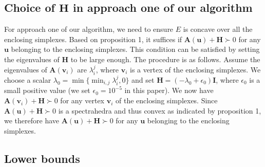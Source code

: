 \documentclass[11pt,bezier,]{article}
\begin{document}


\subsection{Choice of  $\mathbf H$ in approach one of our algorithm\label{subsec:H}}
For approach one of our algorithm, we need to ensure $E$ is concave over all the enclosing simplexes.
Based on proposition 1,
it suffices if $\mathbf A(\mathbf u)+\mathbf H\succ0$ for any $\mathbf u$ belonging to  the enclosing simplexes.
This condition can be satisfied by setting
the eigenvalues  of $\mathbf H$ to be large enough.
The procedure is as follows.
Assume  the eigenvalues of  $\mathbf A(\mathbf v_i)$ are $\lambda^j_i$,
where $\mathbf v_i$ is a vertex of  the enclosing simplexes.
We choose a scalar   
$\lambda_0 =\min \{\min_{i,j} {\lambda_i^j},0 \}$
and   set $\mathbf H=(-\lambda_0+\epsilon_0)\mathbf  I$,
where $\epsilon_0$ is a  small positive value 
(we set $\epsilon_0=10^{-5}$ in this paper).
We now have
$\mathbf A(\mathbf v_i)
+\mathbf H\succ 0$ for any vertex $\mathbf v_i$ of the enclosing simplexes.
Since 
$\mathbf A(\mathbf u)+\mathbf H\succ 0 $ is a spectrahedra and thus  convex as indicated by proposition 1,
we therefore have  $\mathbf A(\mathbf u) + \mathbf H\succ 0$ for any $\mathbf u$
belonging to the enclosing simplexes.






\subsection{Lower bounds}
\end{document}
